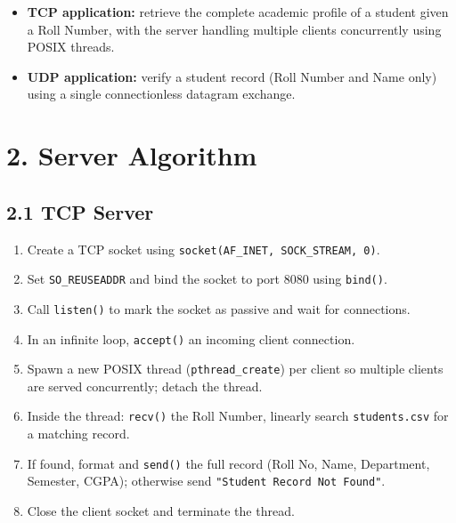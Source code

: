 \documentclass[11pt]{article}
\begin{document}
\begin{itemize}
  \item \textbf{TCP application:} retrieve the complete academic profile of a student given a Roll
  Number, with the server handling multiple clients concurrently using POSIX threads.
  \item \textbf{UDP application:} verify a student record (Roll Number and Name only) using a
  single connectionless datagram exchange.
\end{itemize}

\section*{2. Server Algorithm}
\subsection*{2.1 TCP Server}
\begin{enumerate}
  \item Create a TCP socket using \texttt{socket(AF\_INET, SOCK\_STREAM, 0)}.
  \item Set \texttt{SO\_REUSEADDR} and bind the socket to port 8080 using \texttt{bind()}.
  \item Call \texttt{listen()} to mark the socket as passive and wait for connections.
  \item In an infinite loop, \texttt{accept()} an incoming client connection.
  \item Spawn a new POSIX thread (\texttt{pthread\_create}) per client so multiple clients are
        served concurrently; detach the thread.
  \item Inside the thread: \texttt{recv()} the Roll Number, linearly search \texttt{students.csv}
        for a matching record.
  \item If found, format and \texttt{send()} the full record (Roll No, Name, Department, Semester,
        CGPA); otherwise send \texttt{"Student Record Not Found"}.
  \item Close the client socket and terminate the thread.
\end{enumerate}
\end{document}
